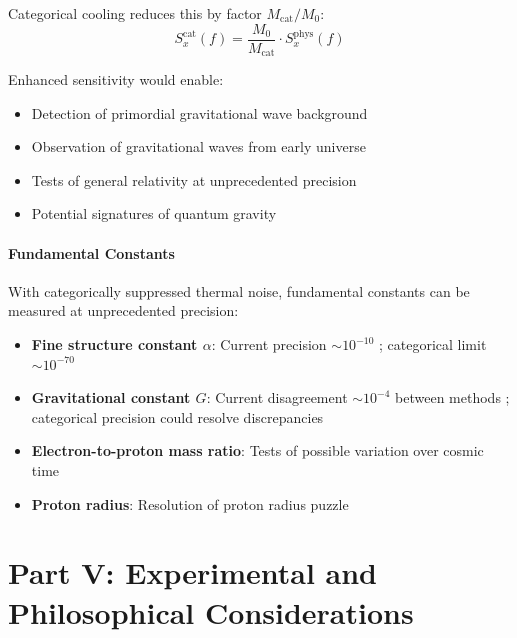 \documentclass[twocolumn,10pt,twoside]{article}
\newcommand{\Mcat}{M_{\mathrm{cat}}}
\begin{document}
Categorical cooling reduces this by factor $\Mcat/M_0$:
\begin{equation}
S_x^{\text{cat}}(f) = \frac{M_0}{\Mcat} \cdot S_x^{\text{phys}}(f)
\end{equation}

Enhanced sensitivity would enable:
\begin{itemize}
    \item Detection of primordial gravitational wave background
    \item Observation of gravitational waves from early universe
    \item Tests of general relativity at unprecedented precision
    \item Potential signatures of quantum gravity
\end{itemize}

\subsection{Fundamental Constants}

With categorically suppressed thermal noise, fundamental constants can be measured at unprecedented precision:

\begin{itemize}
    \item \textbf{Fine structure constant $\alpha$}: Current precision $\sim 10^{-10}$ \cite{parker2018}; categorical limit $\sim 10^{-70}$

    \item \textbf{Gravitational constant $G$}: Current disagreement $\sim 10^{-4}$ between methods \cite{quinn2013}; categorical precision could resolve discrepancies

    \item \textbf{Electron-to-proton mass ratio}: Tests of possible variation over cosmic time \cite{uzan2011}

    \item \textbf{Proton radius}: Resolution of proton radius puzzle \cite{pohl2010}
\end{itemize}


\part*{Part V: Experimental and Philosophical Considerations}
\end{document}
